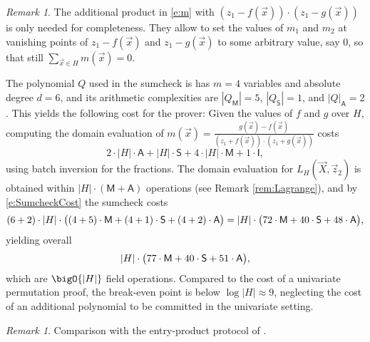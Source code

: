 \documentclass[11pt]{article}
\theoremstyle{definition}
\theoremstyle{remark}
\newtheorem{rem}[thm]{Remark}
\begin{document}
\begin{rem}
\label{rem:PAcompleteness}
The additional product in \eqref{e:m} with $(z_1 - f(\vec x))\cdot(z_1 - g(\vec x))$ is only needed for completeness.
They allow to set the values of $m_1$ and $m_2$ at vanishing points of $z_1 - f(\vec x)$ and $z_1 - g(\vec x)$ to some arbitrary value, say $0$, so that still $\sum_{\vec x\in H} m(\vec x) = 0$.
\end{rem}

The polynomial $Q$ used  in the sumcheck is has $m=4$ variables and absolute degree $d=6$, and its 
 arithmetic complexities are $|Q_\mathsf M| = 5$, $|Q_\mathsf S|= 1$, and $|Q|_\mathsf A = 2$.
This yields the following cost for the prover:
Given the values of $f$ and $g$ over $H$, computing the domain evaluation of $m(\vec x) = \frac{g(\vec x) - f(\vec x)}{(z_1 + f(\vec x))\cdot (z_1 + g(\vec x))}$ costs
\[
2\cdot |H| \cdot \mathsf A + |H|\cdot \mathsf S + 4\cdot |H|\cdot \mathsf M + 1 \cdot \mathsf I ,
\]
using batch inversion for the fractions.
The domain evaluation for $L_H(\vec X, \vec z_2)$ is obtained within $|H|\cdot (\mathsf M + \mathsf A)$ operations (see Remark \ref{rem:Lagrange}), and by \eqref{e:SumcheckCost} the sumcheck costs 
\begin{equation*}
(6 +2) \cdot |H| \cdot \big((4 + 5) \cdot\textsf M +  (4 + 1) \cdot\textsf S + (4 + 2) \cdot \textsf A\big) 
= |H| \cdot \big(72 \cdot\textsf M +  40\cdot\textsf S + 48 \cdot \textsf A\big),
\end{equation*}
yielding overall
\begin{equation}
 |H| \cdot \big(77 \cdot\textsf M +  40\cdot\textsf S + 51 \cdot \textsf A\big),
\end{equation}
which are $\bigO{|H|}$ field operations.
Compared to the cost of a univariate permutation proof, the break-even point is below $\log |H| \approx 9$, neglecting the cost of an additional polynomial to be committed in the univariate setting.

\begin{rem}
Comparison with the entry-product protocol of \cite{TensorCodes}.
\end{rem}
\end{document}
